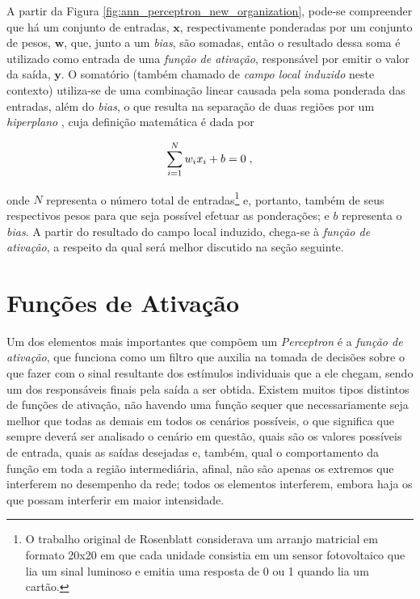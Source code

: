 A partir da Figura \ref{fig:ann_perceptron_new_organization}, pode-se compreender que há um conjunto de entradas, $\bm{x}$, respectivamente ponderadas por um conjunto de pesos, $\bm{w}$, que, junto a um \textit{bias}, são somadas, então o resultado dessa soma é utilizado como entrada de uma \textit{função de ativação}, responsável por emitir o valor da saída, $\bm{y}$. O somatório (também chamado de \textit{campo local induzido} neste contexto) utiliza-se de uma combinação linear causada pela soma ponderada das entradas, além do \textit{bias}, o que resulta na separação de duas regiões por um \textit{hiperplano} \citep{haykin1999neural}, cuja definição matemática é dada por

\begin{equation}
    \sum_{i=1}^{N} w_{i} x_{i} + b = 0
    \label{eq:ann_perceptron_hyperplane}
    \hspace{0.1cm},
    \vspace{0.2cm}
\end{equation}

\noindent onde $N$ representa o número total de entradas\footnote{O trabalho original de Rosenblatt considerava um arranjo matricial em formato 20x20 em que cada unidade consistia em um sensor fotovoltaico que lia um sinal luminoso e emitia uma resposta de 0 ou 1 quando lia um cartão.} e, portanto, também de seus respectivos pesos para que seja possível efetuar as ponderações; e $b$ representa o \textit{bias}. A partir do resultado do campo local induzido, chega-se à \textit{função de ativação}, a respeito da qual será melhor discutido na seção seguinte.



\section{Funções de Ativação}
\label{sec:ann_activation_functions}

Um dos elementos mais importantes que compõem um \textit{Perceptron} é a \textit{função de ativação}, que funciona como um filtro que auxilia na tomada de decisões sobre o que fazer com o sinal resultante dos estímulos individuais que a ele chegam, sendo um dos responsáveis finais pela saída a ser obtida. Existem muitos tipos distintos de funções de ativação, não havendo uma função sequer que necessariamente seja melhor que todas as demais em todos os cenários possíveis, o que significa que sempre deverá ser analisado o cenário em questão, quais são os valores possíveis de entrada, quais as saídas desejadas e, também, qual o comportamento da função em toda a região intermediária, afinal, não são apenas os extremos que interferem no desempenho da rede; todos os elementos interferem, embora haja os que possam interferir em maior intensidade.

